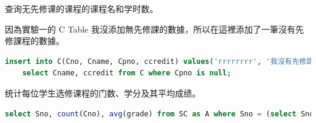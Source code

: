 \documentclass[12pt, a4paper]{report}
\begin{document}
查询无先修课的课程的课程名和学时数。

因為實驗一的 C Table 我沒添加無先修課的數據，所以在這裡添加了一筆沒有先修課程的數據。\\

\begin{lstlisting}[language=SQL]
    insert into C(Cno, Cname, Cpno, ccredit) values('rrrrrrrr', '我沒有先修課', null, 100);
    select Cname, ccredit from C where Cpno is null;
\end{lstlisting}

\begin{figure}[H] %
    \centering %
\end{figure}


\begin{figure}[H] %
    \centering %
\end{figure}

统计每位学生选修课程的门数、学分及其平均成绩。\\

\begin{lstlisting}[language=SQL]
    select Sno, count(Cno), avg(grade) from SC as A where Sno = (select Sno from SC as B where A.Sno = B.Sno)  group by Sno;
\end{lstlisting}
\end{document}
